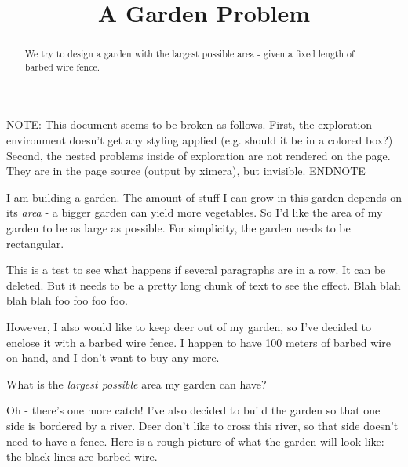 \documentclass{ximera}
\title{A Garden Problem}
\begin{document}
\begin{abstract}
We try to design a garden with the largest possible area - given a fixed length of barbed wire fence.
\end{abstract}
\maketitle

NOTE: This document seems to be broken as follows. First, the exploration environment doesn't get any styling applied (e.g. should it be in a colored box?) Second, the nested problems inside of exploration are not rendered on the page. They are in the page source (output by ximera), but invisible. ENDNOTE

I am building a garden. The amount of stuff I can grow in this garden depends on its \emph{area} - a bigger garden can yield more vegetables. So I'd like the area of my garden to be as large as possible. For simplicity, the garden needs to be rectangular.

This is a test to see what happens if several paragraphs are in a row. It can be deleted. But it needs to be a pretty long chunk of text to see the effect. Blah blah blah blah foo foo foo foo.

However, I also would like to keep deer out of my garden, so I've decided to enclose it with a barbed wire fence. I happen to have 100 meters of barbed wire on hand, and I don't want to buy any more.

\begin{question}
What is the \emph{largest possible} area my garden can have?
\end{question}

Oh - there's one more catch! I've also decided to build the garden so that one side is bordered by a river. Deer don't like to cross this river, so that side doesn't need to have a fence. Here is a rough picture of what the garden will look like: the black lines are barbed wire.
\end{document}
